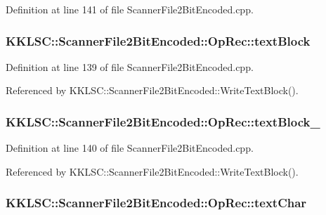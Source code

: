 Definition at line 141 of file Scanner\+File2\+Bit\+Encoded.\+cpp.

\subsubsection[{\texorpdfstring{text\+Block}{textBlock}}]{ K\+K\+L\+S\+C\+::\+Scanner\+File2\+Bit\+Encoded\+::\+Op\+Rec\+::text\+Block}\hypertarget{union_scanner_file2_bit_encoded_1_1_op_rec_abb52dc273b995911ac43478bc0fa7131}{}\label{union_scanner_file2_bit_encoded_1_1_op_rec_abb52dc273b995911ac43478bc0fa7131}


Definition at line 139 of file Scanner\+File2\+Bit\+Encoded.\+cpp.



Referenced by K\+K\+L\+S\+C\+::\+Scanner\+File2\+Bit\+Encoded\+::\+Write\+Text\+Block().

\subsubsection[{\texorpdfstring{text\+Block\+\_\+2}{textBlock_2}}]{ K\+K\+L\+S\+C\+::\+Scanner\+File2\+Bit\+Encoded\+::\+Op\+Rec\+::text\+Block\+\_}\hypertarget{union_scanner_file2_bit_encoded_1_1_op_rec_a248430767d96c07d738f9b7209b324e4}{}\label{union_scanner_file2_bit_encoded_1_1_op_rec_a248430767d96c07d738f9b7209b324e4}


Definition at line 140 of file Scanner\+File2\+Bit\+Encoded.\+cpp.



Referenced by K\+K\+L\+S\+C\+::\+Scanner\+File2\+Bit\+Encoded\+::\+Write\+Text\+Block().

\subsubsection[{\texorpdfstring{text\+Char}{textChar}}]{ K\+K\+L\+S\+C\+::\+Scanner\+File2\+Bit\+Encoded\+::\+Op\+Rec\+::text\+Char}\hypertarget{union_scanner_file2_bit_encoded_1_1_op_rec_a78fb9f5fab109dc2c86190ad9492c067}{}\label{union_scanner_file2_bit_encoded_1_1_op_rec_a78fb9f5fab109dc2c86190ad9492c067}


